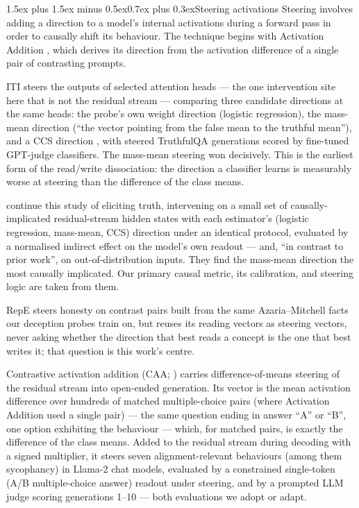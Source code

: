 \documentclass[conference]{IEEEtran}
\makeatletter
\renewcommand{\paragraph}{\@startsection{paragraph}{4}{2em}%
  {1.5ex plus 1.5ex minus 0.5ex}{0.7ex plus 0.3ex}{\normalfont\normalsize\itshape}}
\makeatother
\begin{document}
\paragraph{Steering activations}
Steering involves adding a direction to a model's internal activations during a
forward pass in order to causally shift its behaviour. The technique begins
with Activation Addition \citep{turner2023}, which derives its direction from
the activation difference of a single pair of contrasting prompts.

ITI
\citep{li2023} steers the outputs of selected attention heads --- the one
intervention site here that is not the residual stream --- comparing three
candidate directions at the same heads: the probe's own weight direction
(logistic regression), the mass-mean direction (``the vector pointing from the
false mean to the truthful mean''), and a CCS direction \citep{burns2023}, with
steered TruthfulQA generations scored by fine-tuned GPT-judge classifiers. The
mass-mean steering won decisively. This is the earliest form of the read/write
dissociation: the direction a classifier learns is measurably worse at steering
than the difference of the class means.

\citet{marks2024} continue this study of eliciting truth, intervening on a
small set of causally-implicated residual-stream hidden states with each
estimator's (logistic regression, mass-mean, CCS) direction under an identical
protocol, evaluated by a normalised indirect effect on the model's own readout
--- and, ``in contrast to prior work'', on out-of-distribution inputs. They
find the mass-mean direction the most causally implicated. Our primary causal
metric, its calibration, and steering logic are taken from them.

RepE
\citep{zou2023} steers honesty on contrast pairs built from the same
Azaria--Mitchell facts our deception probes train on, but reuses its
reading vectors as steering vectors, never asking whether the direction that
best reads a concept is the one that best writes it; that question is this
work's centre.

Contrastive activation addition (CAA; \citealt{rimsky2024}) carries
difference-of-means steering of the residual stream into open-ended generation.
Its vector is the mean activation difference over hundreds of matched
multiple-choice pairs (where Activation Addition used a single pair) --- the
same question ending in answer ``A'' or ``B'', one option exhibiting the
behaviour --- which, for matched pairs, is exactly the difference of the class
means. Added to the residual stream during decoding with a signed multiplier,
it steers seven alignment-relevant behaviours (among them sycophancy) in
Llama-2 chat models, evaluated by a constrained single-token (A/B
multiple-choice answer) readout under steering, and by a prompted LLM judge
scoring generations 1--10 --- both evaluations we adopt or adapt.
\end{document}
